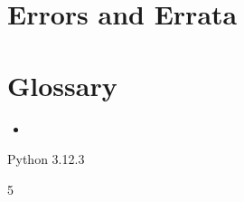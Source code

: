 \documentclass[letterpaper,10pt,english]{sphinxmanual}
\begin{document}
\sphinxstepscope


\chapter{Errors and Errata}
\label{\detokenize{errata:errors-and-errata}}\label{\detokenize{errata::doc}}

\chapter{Glossary}
\label{\detokenize{index:glossary}}\begin{itemize}
\item {} 
\sphinxAtStartPar
{}

\end{itemize}

\sphinxAtStartPar
{}

\begin{sphinxVerbatim}[commandchars=\\\{\}]
Python 3.12.3
\end{sphinxVerbatim}

\begin{sphinxVerbatim}[commandchars=\\\{\}]
5
\end{sphinxVerbatim}



\renewcommand{\indexname}{Index}
\printindex
\end{document}
